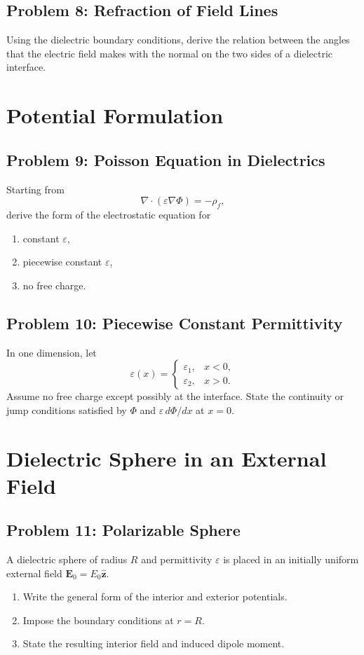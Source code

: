 \documentclass[hidelinks]{article}
\begin{document}
\subsection{Problem 8: Refraction of Field Lines}
Using the dielectric boundary conditions, derive the relation between the angles that the electric field makes with the normal on the two sides of a dielectric interface.

\section{Potential Formulation}
\subsection{Problem 9: Poisson Equation in Dielectrics}
Starting from
\[
\nabla\cdot(\varepsilon \nabla \Phi)=-\rho_f,
\]
derive the form of the electrostatic equation for
\begin{enumerate}[label=\alph*)]
\item constant $\varepsilon$,
\item piecewise constant $\varepsilon$,
\item no free charge.
\end{enumerate}

\subsection{Problem 10: Piecewise Constant Permittivity}
In one dimension, let
\[
\varepsilon(x)=
\begin{cases}
\varepsilon_1, & x<0,\\
\varepsilon_2, & x>0.
\end{cases}
\]
Assume no free charge except possibly at the interface. State the continuity or jump conditions satisfied by $\Phi$ and $\varepsilon\,d\Phi/dx$ at $x=0$.

\section{Dielectric Sphere in an External Field}
\subsection{Problem 11: Polarizable Sphere}
A dielectric sphere of radius $R$ and permittivity $\varepsilon$ is placed in an initially uniform external field $\mathbf{E}_0=E_0\hat{\mathbf{z}}$.
\begin{enumerate}[label=\alph*)]
\item Write the general form of the interior and exterior potentials.
\item Impose the boundary conditions at $r=R$.
\item State the resulting interior field and induced dipole moment.
\end{enumerate}
\end{document}

